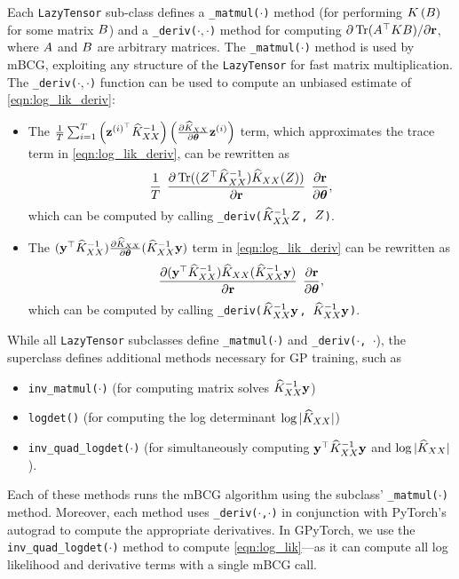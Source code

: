 Each {\tt LazyTensor} sub-class defines a {\tt \_matmul($\cdot$)} method (for performing $K \left( B \right)$ for some matrix $B$) and a {\tt \_deriv($\cdot,\cdot$)} method for computing $\partial \tr{ \bA^\top \bK \bB }/{\partial \br}$,
where $A$ and $B$ are arbitrary matrices.
The {\tt \_matmul($\cdot$)} method is used by mBCG, exploiting any structure of the {\tt LazyTensor} for fast matrix multiplication.
The {\tt \_deriv($\cdot,\cdot$)} function can be used to compute an unbiased estimate of \cref{eqn:log_lik_deriv}:
\begin{itemize}
  \item The $\frac{1}{T}\sum_{i=1}^{T}\left(\mathbf{z}^{(i)^\top} \widehat{K}_{XX}^{-1}\right)\left(\frac{\partial \widehat{K}_{XX}}{\partial \boldsymbol{\theta}}\mathbf{z}^{(i)} \right)$ term,
    which approximates the trace term in \cref{eqn:log_lik_deriv},
    can be rewritten as
    \[
      \frac{1}{T} \:\: \frac{ \partial \tr{ (\bZ^\top \trainK^{-1}) \trainK (\bZ) }}{ \partial \br } \:\: \frac{ \partial \br }{\partial \btheta},
    \]
    which can be computed by calling {\tt \_deriv($\widehat{K}_{XX}^{-1} Z$, $Z$)}.

  \item The $(\mathbf{y}^\top \widehat{K}_{XX}^{-1}) \frac{\partial \widehat{K}_{XX}}{\partial \boldsymbol{\theta}} (\widehat{K}_{XX}^{-1} \mathbf{y})$ term in \cref{eqn:log_lik_deriv}
    can be rewritten as
    \[
      \frac{\partial (\mathbf{y}^\top \widehat{K}_{XX}^{-1}) \widehat{K}_{XX} (\widehat{K}_{XX}^{-1} \mathbf{y}) }{\partial \mathbf{r}} \:\: \frac{\partial \mathbf{r}}{\partial \boldsymbol{\theta}},
    \]
    which can be computed by calling {\tt \_deriv($\widehat{K}_{XX}^{-1} \mathbf{y}$, $\widehat{K}_{XX}^{-1} \mathbf{y}$)}.
\end{itemize}
%
While all {\tt LazyTensor} subclasses define {\tt \_matmul($\cdot$)} and {\tt \_deriv($\cdot$, $\cdot$}),
the superclass defines additional methods necessary for GP training, such as
%
\begin{itemize}
  \item {\tt inv\_matmul($\cdot$)} (for computing matrix solves $\widehat{K}_{XX}^{-1} \mathbf{y}$)
  \item {\tt logdet()} (for computing the log determinant $\log \vert \widehat{K}_{XX} \vert$)
  \item {\tt inv\_quad\_logdet($\cdot$)} (for simultaneously computing $\mathbf{y}^\top \widehat{K}_{XX}^{-1} \mathbf{y}$ and $\log \vert \widehat{K}_{XX} \vert$).
\end{itemize}
%
Each of these methods runs the mBCG algorithm using the subclass' {\tt \_matmul($\cdot$)} method.
Moreover, each method uses {\tt \_deriv($\cdot$,$\cdot$)} in conjunction with PyTorch's autograd \cite{paszke2017automatic} to compute the appropriate derivatives.
In GPyTorch, we use the {\tt inv\_quad\_logdet($\cdot$)} method to compute \cref{eqn:log_lik}---as it can compute all log likelihood and derivative terms with a single mBCG call.

